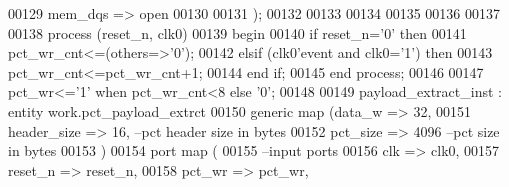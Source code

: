 \begin{DoxyCode}
00129         mem_dqs             => \textcolor{keywordflow}{open}
00130     
00131     \textcolor{vhdlchar}{)};
00132 
00133 
00134 
00135 
00136 
00137 
00138 \textcolor{keywordflow}{process} (reset_n, clk0) 
00139 \textcolor{vhdlkeyword}{    begin }
00140         \textcolor{keywordflow}{if} \textcolor{vhdlchar}{reset_n}\textcolor{vhdlchar}{=}\textcolor{vhdlchar}{'}\textcolor{vhdllogic}{}\textcolor{vhdllogic}{0}\textcolor{vhdlchar}{'} \textcolor{keywordflow}{then} 
00141             \textcolor{vhdlchar}{pct_wr_cnt}\textcolor{vhdlchar}{<=}\textcolor{vhdlchar}{(}\textcolor{keywordflow}{others}\textcolor{vhdlchar}{=}\textcolor{vhdlchar}{>}\textcolor{vhdlchar}{'}\textcolor{vhdllogic}{}\textcolor{vhdllogic}{0}\textcolor{vhdlchar}{'}\textcolor{vhdlchar}{)};
00142         \textcolor{keywordflow}{elsif} \textcolor{vhdlchar}{(}\textcolor{vhdlchar}{clk0}\textcolor{vhdlchar}{'}\textcolor{vhdlkeyword}{event} \textcolor{keywordflow}{and} \textcolor{vhdlchar}{clk0}\textcolor{vhdlchar}{=}\textcolor{vhdlchar}{'}\textcolor{vhdllogic}{}\textcolor{vhdllogic}{1}\textcolor{vhdlchar}{'}\textcolor{vhdlchar}{)} \textcolor{keywordflow}{then} 
00143             \textcolor{vhdlchar}{pct_wr_cnt}\textcolor{vhdlchar}{<=}\textcolor{vhdlchar}{pct_wr_cnt}\textcolor{vhdlchar}{+}\textcolor{vhdllogic}{}\textcolor{vhdllogic}{1};
00144         \textcolor{keywordflow}{end} \textcolor{keywordflow}{if};
00145 \textcolor{keywordflow}{end} \textcolor{keywordflow}{process};
00146 
00147 \textcolor{vhdlchar}{pct_wr}\textcolor{vhdlchar}{<=}\textcolor{vhdlchar}{'}\textcolor{vhdllogic}{}\textcolor{vhdllogic}{1}\textcolor{vhdlchar}{'} \textcolor{keywordflow}{when} \textcolor{vhdlchar}{pct_wr_cnt}\textcolor{vhdlchar}{<}\textcolor{vhdllogic}{}\textcolor{vhdllogic}{8} \textcolor{keywordflow}{else} \textcolor{vhdlchar}{'}\textcolor{vhdllogic}{}\textcolor{vhdllogic}{0}\textcolor{vhdlchar}{'};
00148 
00149 payload\_extract\_inst : \textcolor{keywordflow}{entity} work.pct_payload_extrct 
00150     \textcolor{keywordflow}{generic} \textcolor{keywordflow}{map} (data_w         => \textcolor{vhdllogic}{32},
00151                     header_size     => \textcolor{vhdllogic}{16},\textcolor{keyword}{  --pct header size in bytes }
00152                     pct_size            => \textcolor{vhdllogic}{4096} \textcolor{keyword}{--pct size in bytes}
00153         \textcolor{vhdlchar}{)}
00154   \textcolor{keywordflow}{port} \textcolor{keywordflow}{map} (
00155 \textcolor{keyword}{      --input ports }
00156         clk                     => clk0,
00157         reset_n                 => reset_n,
00158         pct_wr                  => pct_wr,

\end{DoxyCode}
